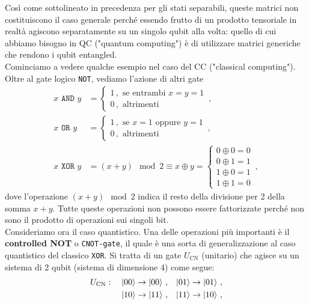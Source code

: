 \noindent Così come sottolineato in precedenza per gli stati separabili, queste matrici non costituiscono il caso generale perché essendo frutto di un prodotto tensoriale in realtà agiscono separatamente su un singolo qubit alla volta: quello di cui abbiamo bisogno in QC ("quantum computing") è di utilizzare matrici generiche che rendono i qubit entangled. \\
\noindent Cominciamo a vedere qualche esempio nel caso del CC ("classical computing"). Oltre al gate logico \texttt{NOT}, vediamo l'azione di altri gate
\begin{align*}
    x \texttt{ AND } y &= 
    \begin{cases}
        1 \, , \text{ se entrambi } x = y = 1 \\
        0 \, , \text{ altrimenti}
    \end{cases} \, , \\
    x \texttt{ OR } y &= 
    \begin{cases}
        1 \, , \text{ se } x = 1 \text{ oppure } y = 1 \\
        0 \, , \text{ altrimenti}
    \end{cases} \, , \\
    x \texttt{ XOR } y &= (x + y) \! \! \! \! \mod 2 \equiv x \oplus y = 
    \begin{cases}
        0 \oplus 0 = 0 \\ 
        0 \oplus 1 = 1 \\
        1 \oplus 0 = 1 \\
        1 \oplus 1 = 0
    \end{cases} \, ,
\end{align*}
dove l'operazione $(x + y) \! \! \! \! \mod 2$ indica il resto della divisione per 2 della somma $x+y$. Tutte queste operazioni non possono essere fattorizzate perché non sono il prodotto di operazioni sui singoli bit. \\
\noindent Consideriamo ora il caso quantistico. Una delle operazioni più importanti è il \textbf{controlled NOT} o \texttt{CNOT-gate}, il quale è una sorta di generalizzazione al caso quantistico del classico \texttt{XOR}. Si tratta di un gate $U_{\text{CN}}$ (unitario) che agisce su un sistema di 2 qubit (sistema di dimensione 4) come segue: 
\begin{align*}
    U_{\text{CN}}: \quad \ket{00} &\rightarrow \ket{00} \, , &\ket{01} &\rightarrow \ket{01} \, , \\
    \ket{10} &\rightarrow \ket{11} \, , &\ket{11} &\rightarrow \ket{10} \, ,
\end{align*}
